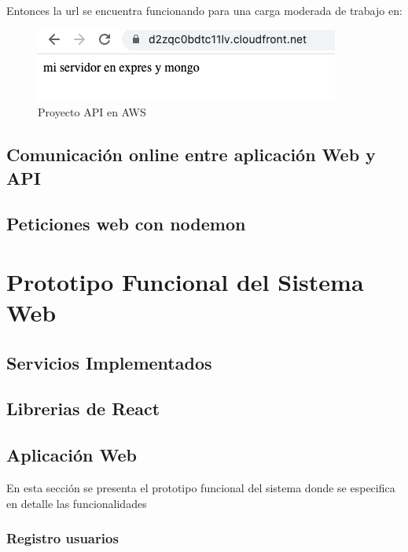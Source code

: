 \documentclass[12pt]{article}
\begin{document}
Entonces la url se encuentra funcionando para una carga moderada de trabajo en: %

\begin{figure}[ht]
\centering
\includegraphics[scale=0.4]{imag/onlineaws.png}
\caption{Proyecto API en AWS}
\label{6}
\end{figure}
\FloatBarrier


\subsection{Comunicación online entre aplicación Web y API}


\subsection{Peticiones web con nodemon}









\section{Prototipo Funcional del Sistema Web }

\subsection{Servicios Implementados}




\subsection{Librerias de React}

\subsection{Aplicación Web}

En esta sección se presenta el prototipo funcional del sistema donde se especifica en detalle las funcionalidades

\subsubsection{Registro usuarios}
\end{document}
